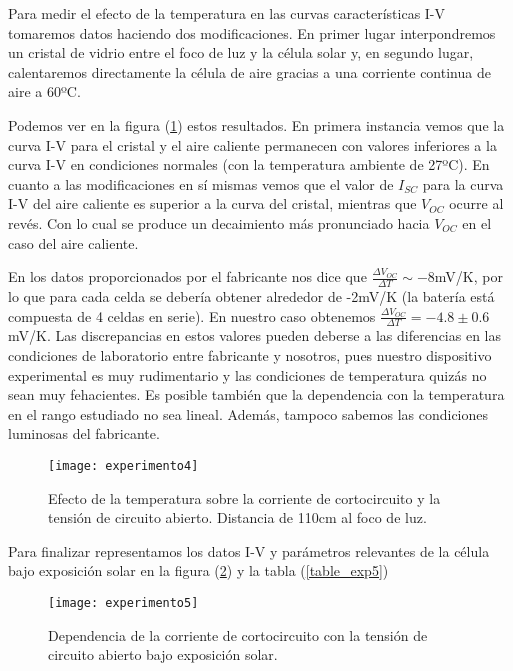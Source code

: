 Para medir el efecto de la temperatura en las curvas características I-V tomaremos datos haciendo dos modificaciones. En primer lugar interpondremos un cristal de vidrio entre el foco de luz y la célula solar y, en segundo lugar, calentaremos directamente la célula de aire gracias a una corriente continua de aire a 60ºC.

Podemos ver en la figura (\ref{figure_exp4}) estos resultados. En primera instancia vemos que la curva I-V para el cristal y el aire caliente permanecen con valores inferiores a la curva I-V en condiciones normales (con la temperatura ambiente de 27ºC). En cuanto a las modificaciones en sí mismas vemos que el valor de $I_{SC}$ para la curva I-V del aire caliente es superior a la curva del cristal, mientras que $V_{OC}$ ocurre al revés. Con lo cual se produce un decaimiento más pronunciado hacia $V_{OC}$ en el caso del aire caliente.

En los datos proporcionados por el fabricante nos dice que $\frac{\Delta V_{OC}}{\Delta T} \sim -8$mV/K, por lo que para cada celda se debería obtener alrededor de -2mV/K (la batería está compuesta de 4 celdas en serie). En nuestro caso obtenemos $\frac{\Delta V_{OC}}{\Delta T} = -4.8 \pm 0.6$mV/K. Las discrepancias en estos valores pueden deberse a las diferencias en las condiciones de laboratorio entre fabricante y nosotros, pues nuestro dispositivo experimental es muy rudimentario y las condiciones de temperatura quizás no sean muy fehacientes. Es posible también que la dependencia con la temperatura en el rango estudiado no sea lineal. Además, tampoco sabemos las condiciones luminosas del fabricante.

\begin{figure}[t]
	\texttt{[image: experimento4]}
	\caption{Efecto de la temperatura sobre la corriente de cortocircuito y la tensión de circuito abierto. Distancia de 110cm al foco de luz.}
	\label{figure_exp4}
\end{figure}

Para finalizar representamos los datos I-V y parámetros relevantes de la célula bajo exposición solar en la figura (\ref{figure_exp5}) y la tabla (\ref{table_exp5})

\begin{figure}[t]
	\texttt{[image: experimento5]}
	\caption{Dependencia de la corriente de cortocircuito con la tensión de circuito abierto bajo exposición solar.}
	\label{figure_exp5}
\end{figure}

